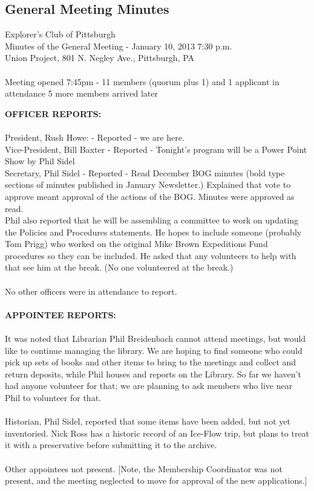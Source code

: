 \documentclass[10pt,a4paper]{article}
\newcommand\subsect[1]{%
  \subsection*{#1}%
  \addcontentsline{toc}{subsection}{#1}}
\begin{document}
\begin{multicols}{2}
\subsect{General Meeting Minutes}

Explorer's Club of Pittsburgh\\
Minutes of the General Meeting - January 10, 2013 7:30 p.m.\\
Union Project, 801 N. Negley Ave., Pittsburgh, PA
\\
\\
Meeting opened 7:45pm - 11 members (quorum plus 1) and 1 applicant in attendance
                                            5 more members arrived later

\textbf{OFFICER REPORTS:}
\\
\\
President, Rush Howe: - Reported - we are here.\\
Vice-President, Bill Baxter - Reported - Tonight's program will be a Power Point Show by Phil Sidel\\
Secretary, Phil Sidel - Reported - Read December BOG minutes (bold type sections of minutes published in January Newsletter.)  Explained that vote to approve meant approval of the actions of the BOG.  Minutes were approved as read.\\
Phil also reported that he will be assembling a committee to work on updating the Policies and Procedures statements.  He hopes to include someone (probably Tom Prigg) who worked on the original Mike Brown Expeditions Fund procedures so they can be included.  He asked that any volunteers to help with that see him at the break.  (No one volunteered at the break.)
\\
\\
No other officers were in attendance to report.
\\
\\
\textbf{APPOINTEE REPORTS:}
\\
\\
It was noted that Librarian Phil Breidenbach cannot attend meetings, but would like to continue managing the library.  We are hoping to find someone who could pick up sets of books and other items to bring to the meetings and collect and return deposits, while Phil houses and reports on the Library.
So far we haven't had anyone volunteer for that; we are planning to ask members who live near Phil to volunteer for that.
\\
\\
Historian, Phil Sidel, reported that some items have been added, but not yet inventoried.  Nick Ross has  a historic record of an Ice-Flow trip, but plans to treat it with a preservative before submitting it to the archive.
\\
\\
Other appointees not present.
[Note, the Membership Coordinator was not present, and the meeting neglected to move for approval of the new applications.]


\end{multicols}
\end{document}
